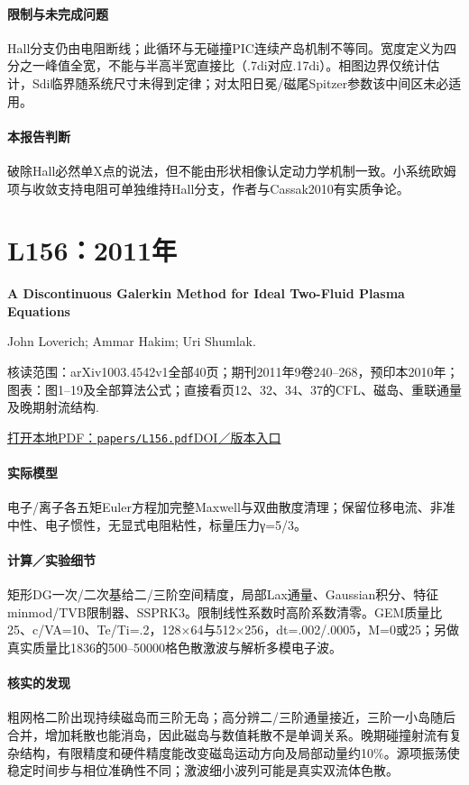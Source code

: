 \paragraph{限制与未完成问题}Hall分支仍由电阻断线；此循环与无碰撞PIC连续产岛机制不等同。宽度定义为四分之一峰值全宽，不能与半高半宽直接比（.7di对应.17di）。相图边界仅统计估计，Sdi临界随系统尺寸未得到定律；对太阳日冕/磁尾Spitzer参数该中间区未必适用。

\paragraph{本报告判断}破除Hall必然单X点的说法，但不能由形状相像认定动力学机制一致。小系统欧姆项与收敛支持电阻可单独维持Hall分支，作者与Cassak2010有实质争论。

\section{L156：2011年}\label{paper:L156}

\textbf{A Discontinuous Galerkin Method for Ideal Two-Fluid Plasma Equations}\citep{L156}\

John Loverich;  Ammar Hakim;  Uri Shumlak.

\textsf{核读范围：}arXiv1003.4542v1全部40页；期刊2011年9卷240–268，预印本2010年；\textsf{图表：}图1–19及全部算法公式；直接看页12、32、34、37的CFL、磁岛、重联通量及晚期射流结构.

\href{run:papers/L156.pdf}{打开本地PDF：\texttt{papers/L156.pdf}}\quad\href{https://doi.org/10.4208/cicp.250509.210610a}{DOI／版本入口}

\paragraph{实际模型}电子/离子各五矩Euler方程加完整Maxwell与双曲散度清理；保留位移电流、非准中性、电子惯性，无显式电阻粘性，标量压力γ=5/3。

\paragraph{计算／实验细节}矩形DG一次/二次基给二/三阶空间精度，局部Lax通量、Gaussian积分、特征minmod/TVB限制器、SSPRK3。限制线性系数时高阶系数清零。GEM质量比25、c/VA=10、Te/Ti=.2，128×64与512×256，dt=.002/.0005，M=0或25；另做真实质量比1836的500–50000格色散激波与解析多模电子波。

\paragraph{核实的发现}粗网格二阶出现持续磁岛而三阶无岛；高分辨二/三阶通量接近，三阶一小岛随后合并，增加耗散也能消岛，因此磁岛与数值耗散不是单调关系。晚期碰撞射流有复杂结构，有限精度和硬件精度能改变磁岛运动方向及局部动量约10\%。源项振荡使稳定时间步与相位准确性不同；激波细小波列可能是真实双流体色散。

